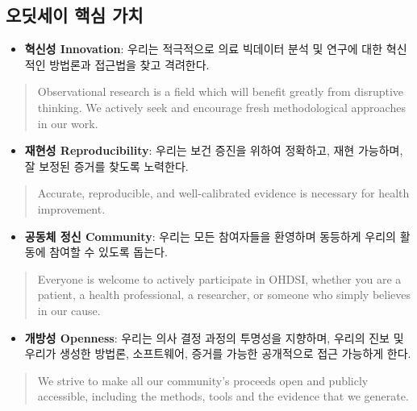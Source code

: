 \documentclass[]{book}
\providecommand{\tightlist}{%
  \setlength{\itemsep}{0pt}\setlength{\parskip}{0pt}}
\begin{document}
\hypertarget{section-1}{%
\subsection{오딧세이 핵심 가치}\label{section-1}}

\begin{itemize}
\tightlist
\item
  \textbf{혁신성 Innovation}: 우리는 적극적으로 의료 빅데이터 분석 및 연구에 대한 혁신적인 방법론과 접근법을 찾고 격려한다.
\end{itemize}

\begin{quote}
Observational research is a field which will benefit greatly from disruptive thinking. We actively seek and encourage fresh methodological approaches in our work.
\end{quote}

\begin{itemize}
\tightlist
\item
  \textbf{재현성 Reproducibility}: 우리는 보건 증진을 위하여 정확하고, 재현 가능하며, 잘 보정된 증거를 찾도록 노력한다.
\end{itemize}

\begin{quote}
Accurate, reproducible, and well-calibrated evidence is necessary for health improvement.
\end{quote}

\begin{itemize}
\tightlist
\item
  \textbf{공동체 정신 Community}: 우리는 모든 참여자들을 환영하며 동등하게 우리의 활동에 참여할 수 있도록 돕는다.
\end{itemize}

\begin{quote}
Everyone is welcome to actively participate in OHDSI, whether you are a patient, a health professional, a researcher, or someone who simply believes in our cause.
\end{quote}

\begin{itemize}
\tightlist
\item
  \textbf{개방성 Openness}: 우리는 의사 결정 과정의 투명성을 지향하며, 우리의 진보 및 우리가 생성한 방법론, 소프트웨어, 증거를 가능한 공개적으로 접근 가능하게 한다.
\end{itemize}

\begin{quote}
We strive to make all our community's proceeds open and publicly accessible, including the methods, tools and the evidence that we generate.
\end{quote}
\end{document}

